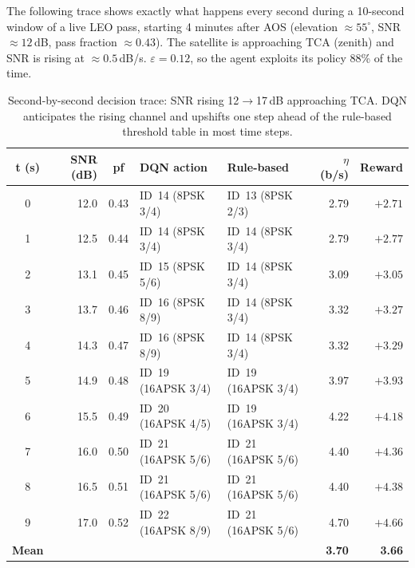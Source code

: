 \documentclass[12pt,a4paper]{report}
\begin{document}
The following trace shows exactly what happens every second during a
10-second window of a live LEO pass, starting 4 minutes after AOS
(elevation $\approx 55^\circ$, SNR $\approx 12$\,dB, pass fraction $\approx 0.43$).
The satellite is approaching TCA (zenith) and SNR is rising at
$\approx 0.5$\,dB/s.  $\varepsilon = 0.12$, so the agent exploits its
policy 88\% of the time.

\begin{table}[H]
\centering
\caption{Second-by-second decision trace: SNR rising 12$\to$17\,dB approaching TCA.
         DQN anticipates the rising channel and upshifts one step ahead of the
         rule-based threshold table in most time steps.}
\label{tab:walkthrough}
\small
\begin{tabular}{crcp{3.0cm}p{2.8cm}rr}
\toprule
\textbf{t (s)} & \textbf{SNR (dB)} & \textbf{pf} & \textbf{DQN action} & \textbf{Rule-based} & \textbf{$\eta$ (b/s)} & \textbf{Reward} \\
\midrule
0 & 12.0 & 0.43 & ID~14 (8PSK 3/4)   & ID~13 (8PSK 2/3)   & 2.79 & $+2.71$ \\
1 & 12.5 & 0.44 & ID~14 (8PSK 3/4)   & ID~14 (8PSK 3/4)   & 2.79 & $+2.77$ \\
2 & 13.1 & 0.45 & ID~15 (8PSK 5/6)   & ID~14 (8PSK 3/4)   & 3.09 & $+3.05$ \\
3 & 13.7 & 0.46 & ID~16 (8PSK 8/9)   & ID~14 (8PSK 3/4)   & 3.32 & $+3.27$ \\
4 & 14.3 & 0.47 & ID~16 (8PSK 8/9)   & ID~14 (8PSK 3/4)   & 3.32 & $+3.29$ \\
5 & 14.9 & 0.48 & ID~19 (16APSK 3/4) & ID~19 (16APSK 3/4) & 3.97 & $+3.93$ \\
6 & 15.5 & 0.49 & ID~20 (16APSK 4/5) & ID~19 (16APSK 3/4) & 4.22 & $+4.18$ \\
7 & 16.0 & 0.50 & ID~21 (16APSK 5/6) & ID~21 (16APSK 5/6) & 4.40 & $+4.36$ \\
8 & 16.5 & 0.51 & ID~21 (16APSK 5/6) & ID~21 (16APSK 5/6) & 4.40 & $+4.38$ \\
9 & 17.0 & 0.52 & ID~22 (16APSK 8/9) & ID~21 (16APSK 5/6) & 4.70 & $+4.66$ \\
\midrule
\textbf{Mean} & & & & & \textbf{3.70} & \textbf{3.66} \\
\bottomrule
\end{tabular}
\end{table}
\end{document}

